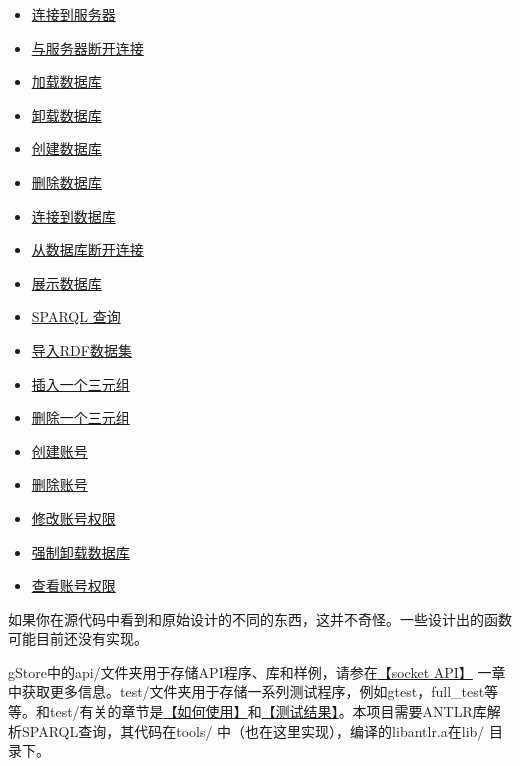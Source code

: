 \documentclass[titlepage, a4paper, 12pt]{article}
\begin{document}
\begin{itemize}
	\item
	\href{run:../jpg/A01-connectServer.jpg}{连接到服务器}
	\item
	\href{run:../jpg/A02-disconnectServer.jpg}{与服务器断开连接}
	\item
	\href{run:../jpg/A03-loadDatabase.jpg}{加载数据库}
	\item
	\href{run:../jpg/A04-unloadDatabase.jpg}{卸载数据库}
	\item
	\href{run:../jpg/A05-buildDatabase.jpg}{创建数据库}
	\item
	\href{run:../jpg/A06-deleteDatabase.jpg}{删除数据库}
	\item
	\href{run:../jpg/A07-connectDatabase.jpg}{连接到数据库}
	\item
	\href{run:../jpg/A08-disconnectDatabase.jpg}{从数据库断开连接}
	\item
	\href{run:../jpg/A09-showDatabase.jpg}{展示数据库}
	\item
	\href{run:../jpg/A10-querySPARQL.jpg}{SPARQL 查询}
	\item
	\href{run:../jpg/A11-loadRDF.jpg}{导入RDF数据集}
	\item
	\href{run:../jpg/A12-insertRDF.jpg}{插入一个三元组}
	\item
	\href{run:../jpg/A13-deleteRDF.jpg}{删除一个三元组}
	\item
	\href{run:../jpg/B01-createAccount.jpg}{创建账号}
	\item
	\href{run:../jpg/B02-deleteAccount.jpg}{删除账号}
	\item
	\href{run:../jpg/B03-changeAccount.jpg}{修改账号权限}
	\item
	\href{run:../jpg/B04-removeDatabase.jpg}{强制卸载数据库}
	\item
	\href{run:../jpg/B05-showAccount.jpg}{查看账号权限}
\end{itemize}

如果你在源代码中看到和原始设计的不同的东西，这并不奇怪。一些设计出的函数可能目前还没有实现。


gStore中的api/文件夹用于存储API程序、库和样例，请参在\hyperref[chapter05]{【socket API】} 一章中获取更多信息。test/文件夹用于存储一系列测试程序，例如gtest，full\_test等等。和test/有关的章节是\hyperref[chapter04]{【如何使用】}和\hyperref[chapter15]{【测试结果】}。本项目需要ANTLR库解析SPARQL查询，其代码在tools/ 中（也在这里实现），编译的libantlr.a在lib/ 目录下。
\end{document}

